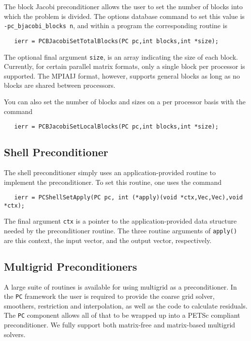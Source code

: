 The block Jacobi preconditioner allows the user to set the number of blocks 
into which the problem is divided.  The options database command to set 
this value is {\tt -pc\_bjacobi\_blocks n}, and within a program the
corresponding routine is  
\begin{verbatim}
   ierr = PCBJacobiSetTotalBlocks(PC pc,int blocks,int *size);
\end{verbatim}
The optional final argument {\tt size}, is an array indicating the size of 
each block.  
Currently, for certain parallel matrix formats, 
only a single block per processor is supported. The MPIAIJ format, however, 
supports general blocks as long as no blocks are shared between processors.

You can also set the number of blocks and sizes on a per processor basis with the 
command 
\begin{verbatim}
   ierr = PCBJacobiSetLocalBlocks(PC pc,int blocks,int *size);
\end{verbatim}

\subsection{Shell Preconditioner}

The shell preconditioner simply uses an application-provided routine to 
implement the preconditioner. To set this routine, one uses the 
command 
\begin{verbatim}
   ierr = PCShellSetApply(PC pc, int (*apply)(void *ctx,Vec,Vec),void *ctx);
\end{verbatim}
The final argument {\tt ctx} is a pointer to the application-provided 
data structure needed by the preconditioner routine.
The three routine arguments of {\tt apply()} are this context, the
input vector, and the output vector, respectively.

\subsection{Multigrid Preconditioners} 

A large suite of routines is available for using multigrid as a
preconditioner. In the {\tt PC} framework the user is required to provide 
the coarse grid solver, smoothers, restriction and interpolation, 
as well as the code to calculate residuals. The {\tt PC} component 
allows all of that to be wrapped up into a PETSc compliant preconditioner. 
We fully support both matrix-free and matrix-based multigrid solvers.

